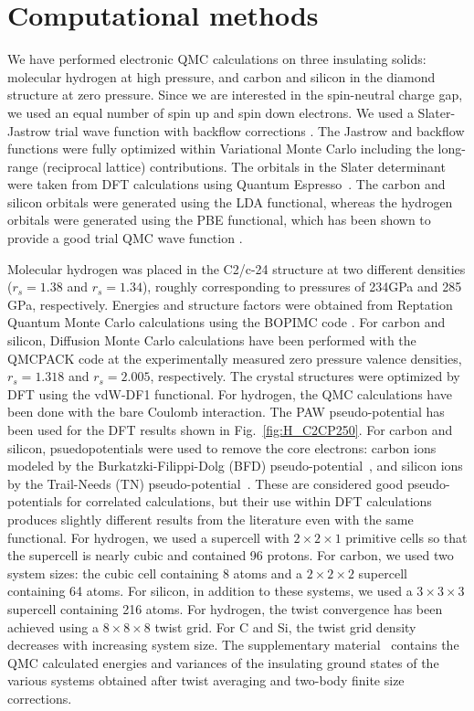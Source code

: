 \section{Computational methods\label{sec:methods}}

We have performed electronic QMC calculations on three insulating solids:
molecular hydrogen at high pressure,
and carbon and silicon in the diamond structure at zero pressure. Since we are interested in the
spin-neutral charge gap, we used an equal number of spin up and spin down electrons. We used a Slater-Jastrow  trial wave function with backflow corrections \cite{Holzmann2003,Trial}. The Jastrow and backflow functions were fully optimized within Variational Monte Carlo including the long-range (reciprocal lattice) contributions.
The orbitals in the Slater determinant were taken from DFT calculations using Quantum Espresso~\cite{QE2009, QE2017}. The carbon and silicon orbitals were generated using the LDA functional, whereas the hydrogen orbitals were generated using the PBE functional, which has been shown to provide a good trial QMC wave function \cite{Morales2012,Pierleoni2016}.

Molecular hydrogen was placed in the C2/c-24 structure \cite{Pickard2007} at two different densities ($r_s=1.38$ and $r_s=1.34$), roughly corresponding to pressures of 234GPa and 285 GPa, respectively.
Energies and structure factors were obtained from Reptation Quantum Monte Carlo calculations using the BOPIMC code \cite{BOPIMC}. For carbon and silicon, Diffusion Monte Carlo calculations have been performed with the QMCPACK code \cite{QMCPACK}
at the experimentally measured zero pressure valence densities, $r_s=1.318$ and $r_s=2.005$, respectively.
The crystal structures were optimized by DFT using the vdW-DF1 functional.
For hydrogen, the QMC calculations have been done with the bare Coulomb interaction. The PAW pseudo-potential has been used for the DFT results shown in Fig.~\ref{fig:H_C2CP250}. For carbon and silicon, psuedopotentials were used to remove the core electrons: carbon ions modeled by the Burkatzki-Filippi-Dolg (BFD) pseudo-potential~\cite{Burkatzki2007}, and silicon ions by the Trail-Needs (TN) pseudo-potential~\cite{Trail2005}. These are considered good pseudo-potentials for correlated calculations, but their use within DFT calculations produces slightly different results from the literature even with the same functional.
For hydrogen, we used a supercell with  $2 \times 2 \times 1$ primitive cells so that the supercell is nearly cubic and contained 96 protons. For carbon, we used two system sizes: the cubic cell containing 8 atoms and a $2\times 2\times 2$ supercell containing 64 atoms. For silicon, in addition to these systems, we used a $3\times 3\times 3$ supercell containing 216 atoms.
For hydrogen, the twist convergence has been achieved using a $8 \times 8 \times 8$ twist grid. For C and Si, the twist grid density decreases with increasing system size. The supplementary material~\cite{supp} contains the QMC calculated energies and variances of the insulating ground states
of the various systems obtained after twist averaging and two-body finite size corrections.

